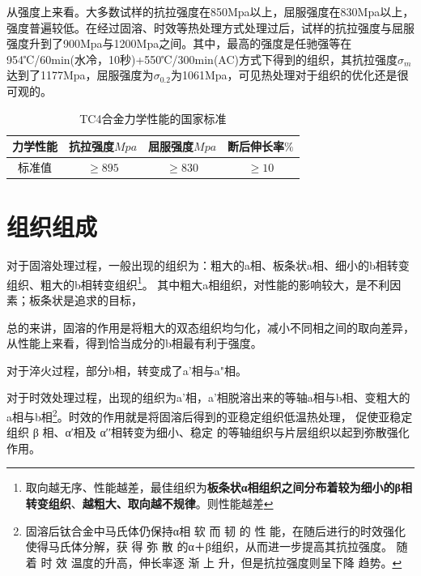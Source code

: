 \documentclass[
class = book,
zihao = -4,
font = noto,
paper = a4paper,
openany
]{easybook}
\begin{document}
从强度上来看。大多数试样的抗拉强度在850Mpa以上，屈服强度在830Mpa以上，强度普遍较低。在经过固溶、时效等热处理方式处理过后，试样的抗拉强度与屈服强度升到了900Mpa与1200Mpa之间。其中，最高的强度是任驰强等\cite{renchiqiangGurongshixiaoduiTC4taihejinxianweizuzhihelixuexingnengdeyingxiang2022}在954℃/60min(水冷，10秒)+550℃/300min(AC)方式下得到的组织，其抗拉强度$ \sigma_m $达到了1177Mpa，屈服强度为$ \sigma_{0.2} $为1061Mpa，可见热处理对于组织的优化还是很可观的。
\begin{table}[htbp]
	\centering
	\label{sec:mytc4machin}
	\caption{TC4合金力学性能的国家标准}
	\begin{tabular}{cccc}
		\toprule
		力学性能& 抗拉强度$Mpa  $& 屈服强度$ Mpa $&断后伸长率$ \% $\\ \midrule
		标准值 &$ \ge 895 $&$ \ge 830 $&$ \ge 10 $ \\ \bottomrule
	\end{tabular}
\end{table}




\section{组织组成}
对于固溶处理过程，一般出现的组织为：粗大的a相、板条状a相、细小的b相转变组织、粗大的b相转变组织\footnote{取向越无序、性能越差，最佳组织为\textbf{板条状α相组织之间分布着较为细小的β相转变组织}、\textbf{越粗大、取向越不规律}。则性能越差}。\cite{zhanghaoyinGurongShixiaoduiTC4taihejinzuzhihelixuexingnengdeyingxiang2014}
其中粗大a相组织，对性能的影响较大，是不利因素；板条状是追求的目标，

总的来讲，固溶的作用是将粗大的双态组织均匀化，减小不同相之间的取向差异，从性能上来看，得到恰当成分的b相最有利于强度。

对于淬火过程，部分b相，转变成了a'相与a"相。

对于时效处理过程，出现的组织为a'相，a'相脱溶出来的等轴a相与b相、变粗大的a相与b相\footnote{固溶后钛合金中马氏体仍保持α相 软 而 韧 的 性 能，在随后进行的时效强化使得马氏体分解，获 得 弥 散 的α＋β组织，从而进一步提高其抗拉强度。 随 着 时 效 温度的升高，伸长率逐 渐 上 升，但是抗拉强度则呈下降 趋势。}。\cite{zhanghaoyinGurongShixiaoduiTC4taihejinzuzhihelixuexingnengdeyingxiang2014}时效的作用就是将固溶后得到的亚稳定组织低温热处理， 促使亚稳定组织 β 相、α′相及 α′′相转变为细小、稳定 的等轴组织与片层组织以起到弥散强化作用。
\end{document}
